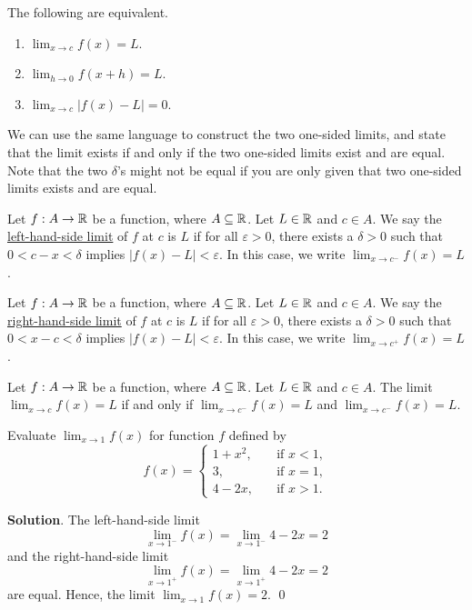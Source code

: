 \documentclass[11pt]{book}
\begin{document}
\begin{theorem}
    The following are equivalent.
    \vspace{-1em}
    \begin{multicols}{3}
        \begin{enumerate}
            \item $\displaystyle\lim_{x\to c}f(x)=L$.
            \item $\displaystyle\lim_{h\to 0}f(x+h)=L$.
            \item $\displaystyle\lim_{x\to c}|f(x)-L|=0$.
        \end{enumerate}
    \end{multicols}
    \vspace{0.01em}
\end{theorem}

We can use the same language to construct the two one-sided limits, and state that the limit exists if and only if the two one-sided limits exist and are equal. Note that the two $\delta$'s might not be equal if you are only given that two one-sided limits exists and are equal.

\begin{definition}
    Let $f:A\to\mathbb{R}$ be a function, where $A\subseteq\mathbb{R}$. Let $L\in\mathbb{R}$ and $c\in A$. We say the \underline{left-hand-side limit} of $f$ at $c$ is $L$ if for all $\varepsilon>0$, there exists a $\delta>0$ such that $0<c-x<\delta$ implies $|f(x)-L|<\varepsilon$. In this case, we write $\displaystyle\lim_{x\to c^-}f(x)=L$.
\end{definition}

\begin{definition}
    Let $f:A\to\mathbb{R}$ be a function, where $A\subseteq\mathbb{R}$. Let $L\in\mathbb{R}$ and $c\in A$. We say the \underline{right-hand-side limit} of $f$ at $c$ is $L$ if for all $\varepsilon>0$, there exists a $\delta>0$ such that $0<x-c<\delta$ implies $|f(x)-L|<\varepsilon$. In this case, we write $\displaystyle\lim_{x\to c^+}f(x)=L$.
\end{definition}

\begin{theorem}
    Let $f:A\to\mathbb{R}$ be a function, where $A\subseteq\mathbb{R}$. Let $L\in\mathbb{R}$ and $c\in A$. The limit $\displaystyle\lim_{x\to c}f(x)=L$ if and only if $\displaystyle\lim_{x\to c^-}f(x)=L$ and $\displaystyle\lim_{x\to c^-}f(x)=L$.
\end{theorem}

\begin{example}
    Evaluate $\displaystyle\lim_{x\to 1}f(x)$ for function $f$ defined by $$f(x)=\left\{\begin{array}{ll}
        1+x^2, \quad & \text{if $x<1$},\\
        3, \quad & \text{if $x=1$},\\
        4-2x, \quad & \text{if $x>1$}.
    \end{array}\right.$$
\end{example}
\textbf{Solution}. The left-hand-side limit $$\lim_{x\to 1^-}f(x)=\lim_{x\to 1^-}4-2x=2$$ and the right-hand-side limit $$\lim_{x\to 1^+}f(x)=\lim_{x\to 1^+}4-2x=2$$ are equal. Hence, the limit $\displaystyle\lim_{x\to 1}f(x)=2$. \qed
\end{document}
